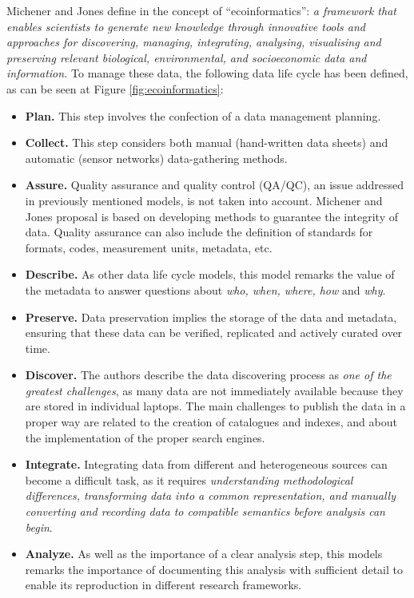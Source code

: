Michener and Jones define in \cite{michener_ecoinformatics:_2012} the concept of ``ecoinformatics'':  \textit{a framework that enables scientists to generate new knowledge through innovative tools and approaches for discovering, managing, integrating, analysing, visualising and preserving relevant biological, environmental, and socioeconomic data and information.} To manage these data, the following data life cycle  has been defined, as can be seen at Figure \ref{fig:ecoinformatics}:
\begin{itemize}
    \item \textbf{Plan.} This step involves the confection of a data management planning. 
    \item \textbf{Collect.} This step considers both manual (hand-written data sheets) and automatic (sensor networks) data-gathering methods.
    \item \textbf{Assure.} Quality assurance and quality control (QA/QC), an issue addressed in previously mentioned models, is not taken into account. Michener and Jones proposal is based on developing methods to guarantee the integrity of  data. Quality assurance can also include the definition of standards for formats, codes, measurement units, metadata, etc.
    \item \textbf{Describe.} As other data life cycle models, this model remarks the value of the metadata to answer questions about \textit{who, when, where, how} and \textit{why}.
    \item \textbf{Preserve.} Data preservation implies the storage of the data and metadata, ensuring that these data can be verified, replicated and actively curated over time.
    \item \textbf{Discover.} The authors describe the data discovering process as \textit{one of the greatest challenges}, as many data are not immediately available because they are stored in individual laptops. The main challenges to publish the data in a proper way are related to the creation of catalogues and indexes, and about the implementation of the proper search engines.
    \item \textbf{Integrate.} Integrating data from different and heterogeneous sources can become a difficult task, as it requires \textit{understanding methodological differences, transforming data into a common representation, and manually converting and recording data to compatible semantics before analysis can begin}. 
    \item \textbf{Analyze.} As well as the importance of a clear analysis step, this models remarks the importance of documenting this analysis with sufficient detail to enable its reproduction in different research frameworks.
\end{itemize}

